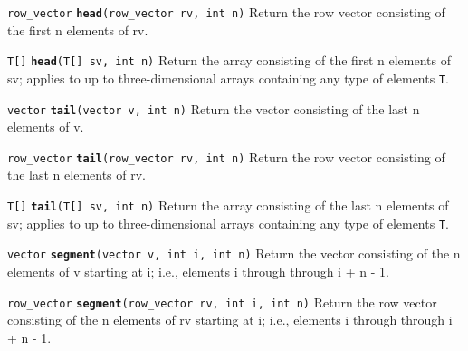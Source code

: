\documentclass[
  10pt,
]{book}
\begin{document}

\texttt{row\_vector} \textbf{\texttt{head}}\texttt{(row\_vector\ rv,\ int\ n)}\newline
Return the row vector consisting of the first n elements of rv.


\texttt{T{[}{]}} \textbf{\texttt{head}}\texttt{(T{[}{]}\ sv,\ int\ n)}\newline
Return the array consisting of the first n elements of sv; applies to
up to three-dimensional arrays containing any type of elements \texttt{T}.


\texttt{vector} \textbf{\texttt{tail}}\texttt{(vector\ v,\ int\ n)}\newline
Return the vector consisting of the last n elements of v.


\texttt{row\_vector} \textbf{\texttt{tail}}\texttt{(row\_vector\ rv,\ int\ n)}\newline
Return the row vector consisting of the last n elements of rv.


\texttt{T{[}{]}} \textbf{\texttt{tail}}\texttt{(T{[}{]}\ sv,\ int\ n)}\newline
Return the array consisting of the last n elements of sv; applies to
up to three-dimensional arrays containing any type of elements \texttt{T}.


\texttt{vector} \textbf{\texttt{segment}}\texttt{(vector\ v,\ int\ i,\ int\ n)}\newline
Return the vector consisting of the n elements of v starting at i;
i.e., elements i through through i + n - 1.


\texttt{row\_vector} \textbf{\texttt{segment}}\texttt{(row\_vector\ rv,\ int\ i,\ int\ n)}\newline
Return the row vector consisting of the n elements of rv starting at
i; i.e., elements i through through i + n - 1.
\end{document}
